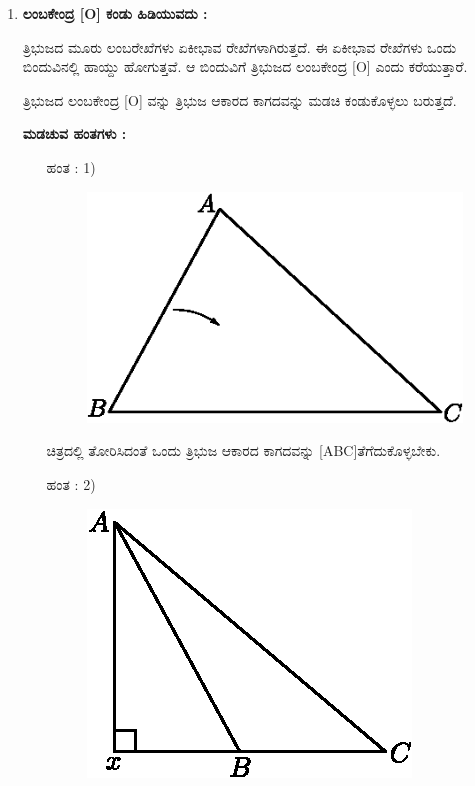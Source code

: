  \begin{enumerate}
    \item \textbf{ಲಂಬಕೇಂದ್ರ [O] ಕಂಡು ಹಿಡಿಯುವದು :}
 
 ತ್ರಿಭುಜದ ಮೂರು ಲಂಬರೇಖೆಗಳು ಏಕೀಭಾವ ರೇಖೆಗಳಾಗಿರುತ್ತದೆ. ಈ ಏಕೀಭಾವ ರೇಖೆಗಳು ಒಂದು ಬಿಂದುವಿನಲ್ಲಿ ಹಾಯ್ದು ಹೋಗುತ್ತವೆ. ಆ ಬಿಂದುವಿಗೆ ತ್ರಿಭುಜದ ಲಂಬಕೇಂದ್ರ [O] ಎಂದು ಕರೆಯುತ್ತಾರೆ. 
 
 ತ್ರಿಭುಜದ ಲಂಬಕೇಂದ್ರ [O] ವನ್ನು ತ್ರಿಭುಜ ಆಕಾರದ ಕಾಗದವನ್ನು ಮಡಚಿ ಕಂಡುಕೊಳ್ಳಲು ಬರುತ್ತದೆ. 
 
 
    \noindent
 \textbf{ಮಡಚುವ ಹಂತಗಳು :}
 
 \begin{itemize}
 \item[ಹಂತ : 1)]
 ~
 \begin{figure}[H]
\centering
\includegraphics[scale=.98]{src/figure/chap1/fig1-35a.eps}
\end{figure}
 
 ಚಿತ್ರದಲ್ಲಿ ತೋರಿಸಿದಂತೆ ಒಂದು ತ್ರಿಭುಜ ಆಕಾರದ ಕಾಗದವನ್ನು [ABC]\break ತೆಗೆದುಕೊಳ್ಳಬೇಕು. 
 
 \item[ಹಂತ : 2)] 
 ~
 \begin{figure}[H]
\centering
\includegraphics[scale=.98]{src/figure/chap1/fig1-35b.eps}
\end{figure}
 

\end{itemize}
\end{enumerate}
